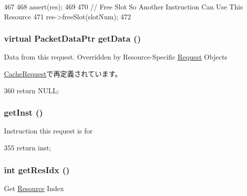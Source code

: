\begin{DoxyCode}
467 {
468     assert(res);
469 
470     // Free Slot So Another Instruction Can Use This Resource
471     res->freeSlot(slotNum);
472 }
\end{DoxyCode}
\hypertarget{classResourceRequest_a050fcb534c3978b1caf1556a4102e320}{
\subsubsection[{getData}]{\setlength{\rightskip}{0pt plus 5cm}virtual {\bf PacketDataPtr} getData ()}}
\label{classResourceRequest_a050fcb534c3978b1caf1556a4102e320}
Data from this request. Overridden by Resource-\/Specific \hyperlink{classRequest}{Request} Objects 

\hyperlink{classCacheRequest_a050fcb534c3978b1caf1556a4102e320}{CacheRequest}で再定義されています。


\begin{DoxyCode}
360 { return NULL; }
\end{DoxyCode}
\hypertarget{classResourceRequest_af6db09c48a5520b022682b3f32ff771c}{
\subsubsection[{getInst}]{ getInst ()}}
\label{classResourceRequest_af6db09c48a5520b022682b3f32ff771c}
Instruction this request is for 


\begin{DoxyCode}
355 { return inst; }
\end{DoxyCode}
\hypertarget{classResourceRequest_a86a16ad39036a0cf078dcf2d96455c38}{
\subsubsection[{getResIdx}]{\setlength{\rightskip}{0pt plus 5cm}int getResIdx ()}}
\label{classResourceRequest_a86a16ad39036a0cf078dcf2d96455c38}
Get \hyperlink{classResource}{Resource} Index 


